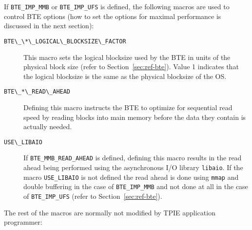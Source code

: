 \noindent
If \verb|BTE_IMP_MMB| or \verb|BTE_IMP_UFS| is defined, the following macros
are used to control BTE options (how to set the options for maximal
performance is discussed in the next section):

  \begin{description}

  \item[{\verb|BTE\_\*\_LOGICAL\_BLOCKSIZE\_FACTOR|}] This macro sets the
  logical blocksize used by the BTE in units of the physical block size
  (refer to Section~\ref{sec:ref-bte}). Value 1 indicates that the logical
  blocksize is the same as the physical blocksize of the OS.

  \item[{\verb|BTE\_*\_READ\_AHEAD|}] Defining this macro instructs the
  BTE to optimize for sequential read speed by reading blocks into main
  memory before the data they contain is actually needed.

  
  \item[{\verb|USE\_LIBAIO|}] If \verb|BTE_MMB_READ_AHEAD| is defined,
  defining this macro results in the read ahead being performed using the
  asynchronous I/O library \verb|libaio|. If the macro {\verb|USE_LIBAIO|}
  is not defined the read ahead is done using \verb|mmap| and double
  buffering in the case of \verb|BTE_IMP_MMB| and not done at all in the
  case of \verb|BTE_IMP_UFS| (refer to Section~\ref{sec:ref-bte}).

  \end{description}

\noindent
The rest of the macros are normally not modified by TPIE application
programmer:

